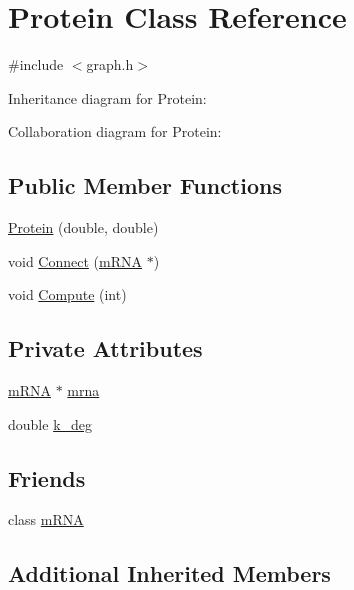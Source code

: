 \hypertarget{class_protein}{\section{Protein Class Reference}
\label{class_protein}
}


{\ttfamily \#include $<$graph.\-h$>$}



Inheritance diagram for Protein\-:


Collaboration diagram for Protein\-:
\subsection*{Public Member Functions}
\begin{DoxyCompactItemize}
\item 
\hyperlink{class_protein_a9f0a706232fd3e68c15263e2102fec02}{Protein} (double, double)
\item 
void \hyperlink{class_protein_a52cf8da9e08eeb67b44114af2d12f45c}{Connect} (\hyperlink{classm_r_n_a}{m\-R\-N\-A} $\ast$)
\item 
void \hyperlink{class_protein_af977204f0e2ffe5544bcab971d5eeb0d}{Compute} (int)
\end{DoxyCompactItemize}
\subsection*{Private Attributes}
\begin{DoxyCompactItemize}
\item 
\hyperlink{classm_r_n_a}{m\-R\-N\-A} $\ast$ \hyperlink{class_protein_a28268d2851fd44eee68754d45301d6e1}{mrna}
\item 
double \hyperlink{class_protein_a21c7f43c3a4e313b02e93f8b682a2074}{k\-\_\-deg}
\end{DoxyCompactItemize}
\subsection*{Friends}
\begin{DoxyCompactItemize}
\item 
class \hyperlink{class_protein_a904bf77ec17baad950eb63ea5c40c6ea}{m\-R\-N\-A}
\end{DoxyCompactItemize}
\subsection*{Additional Inherited Members}


